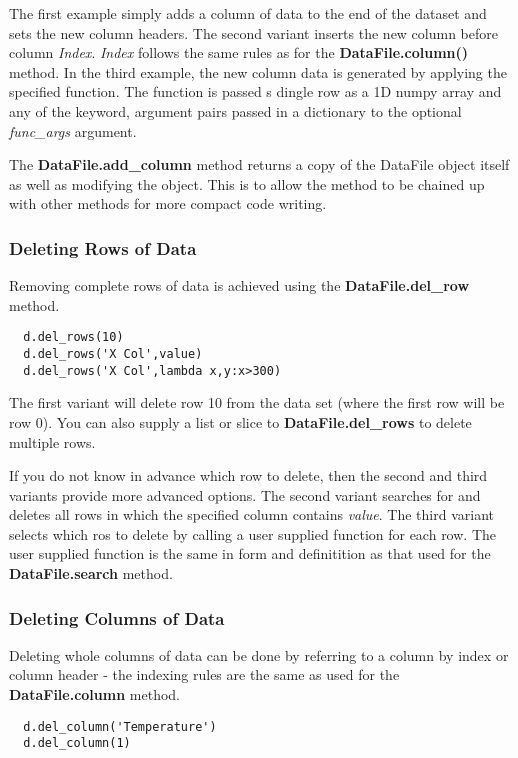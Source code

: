 \documentclass[a4paper,11pt]{scrartcl}
\begin{document}
The first example simply adds a column of data to the end of the dataset and
sets the new column headers. The second variant  inserts the new column before
column \textit{Index}. \textit{Index} follows the same rules as for the
\textbf{DataFile.column()} method. In the third example, the new column data is
generated by applying the specified function. The function is passed s dingle
row as a 1D numpy array and any of the keyword, argument pairs passed in a
dictionary to the optional \textit{func\_args} argument.

The \textbf{DataFile.add\_column} method returns a copy of the DataFile object
itself as well as modifying the object. This is to allow the method to be chained
up with other methods for more compact code writing.

\subsubsection{Deleting Rows of Data}

Removing complete rows of data is achieved using the \textbf{DataFile.del\_row}
method.

\begin{lstlisting}
  d.del_rows(10)
  d.del_rows('X Col',value)
  d.del_rows('X Col',lambda x,y:x>300)
\end{lstlisting}

The first variant will delete row 10 from the data set (where the first row will
be row 0). You can also supply a list or slice to \textbf{DataFile.del\_rows} to
delete multiple rows.

If you do not know in advance which row to delete, then the second and third
variants provide more advanced options. The second variant searches for and
deletes all rows in which the specified column contains \textit{value}. The
third variant selects which ros to delete by calling a user supplied function
for each row. The user supplied function is the same in form and definitition as
that used for the \textbf{DataFile.search} method.

\subsubsection{Deleting Columns of Data}

Deleting whole columns of data can be done by referring to a column by index or
column header - the indexing rules are the same as used for the
\textbf{DataFile.column} method.

\begin{lstlisting}
  d.del_column('Temperature')
  d.del_column(1)
\end{lstlisting}
\end{document}
